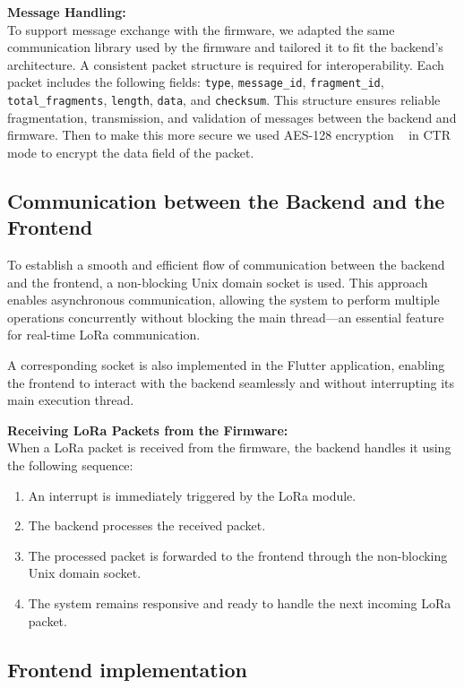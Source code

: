 \textbf{Message Handling:} \\
To support message exchange with the firmware, 
we adapted the same communication library used by the firmware and tailored it to fit the backend's architecture. 
A consistent packet structure is required for interoperability. Each packet includes the following fields: 
\texttt{type}, \texttt{message\_id}, \texttt{fragment\_id}, \texttt{total\_fragments}, \texttt{length}, \texttt{data}, and \texttt{checksum}. 
This structure ensures reliable fragmentation, transmission, and validation of messages between the backend and firmware.
Then to make this more secure we used AES-128 encryption ~\cite{tiny-AES} in CTR mode to encrypt the data field of the packet. 

\subsection{Communication between the Backend and the Frontend}

To establish a smooth and efficient flow of communication between the backend and the frontend, a non-blocking Unix domain socket is used.
This approach enables asynchronous communication, allowing the system to perform multiple operations concurrently without blocking the main 
thread—an essential feature for real-time LoRa communication.

A corresponding socket is also implemented in the Flutter application, enabling the frontend to interact with the backend seamlessly 
and without interrupting its main execution thread.

\vspace{0.5em}
\textbf{Receiving LoRa Packets from the Firmware:} \\
When a LoRa packet is received from the firmware, the backend handles it using the following sequence:

\begin{enumerate}
  \item An interrupt is immediately triggered by the LoRa module.
  \item The backend processes the received packet.
  \item The processed packet is forwarded to the frontend through the non-blocking Unix domain socket.
  \item The system remains responsive and ready to handle the next incoming LoRa packet.
\end{enumerate}

\subsection{Frontend implementation}

